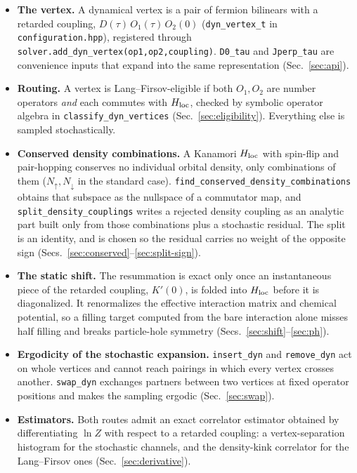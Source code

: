 \documentclass[a4paper,12pt]{article}
\renewcommand{\t}{\ensuremath{\tau}}
\newcommand{\Hloc}{\ensuremath{H_{\rm loc}}}
\begin{document}
\begin{itemize}
  \item \textbf{The vertex.} A dynamical vertex is a pair of fermion bilinears with a
    retarded coupling, $D(\t)\,O_1(\t)\,O_2(0)$ (\texttt{dyn\_vertex\_t} in
    \texttt{configuration.hpp}), registered through
    \texttt{solver.add\_dyn\_vertex(op1,op2,coupling)}. \texttt{D0\_tau} and
    \texttt{Jperp\_tau} are convenience inputs that expand into the same representation
    (Sec.~\ref{sec:api}).
  \item \textbf{Routing.} A vertex is Lang--Firsov-eligible if both $O_1,O_2$ are number
    operators \emph{and} each commutes with $\Hloc$, checked by symbolic operator algebra
    in \texttt{classify\_dyn\_vertices} (Sec.~\ref{sec:eligibility}). Everything else is
    sampled stochastically.
  \item \textbf{Conserved density combinations.} A Kanamori $\Hloc$ with spin-flip and
    pair-hopping conserves no individual orbital density, only combinations of them
    ($N_\uparrow,N_\downarrow$ in the standard case).
    \texttt{find\_conserved\_density\_combinations} obtains that subspace as the nullspace
    of a commutator map, and \texttt{split\_density\_couplings} writes a rejected density
    coupling as an analytic part built only from those combinations plus a stochastic
    residual. The split is an identity, and is chosen so the residual carries no weight of
    the opposite sign (Secs.~\ref{sec:conserved}--\ref{sec:split-sign}).
  \item \textbf{The static shift.} The resummation is exact only once an instantaneous
    piece of the retarded coupling, $K'(0)$, is folded into $\Hloc$ before it is
    diagonalized. It renormalizes the effective interaction matrix and chemical potential,
    so a filling target computed from the bare interaction alone misses half filling and
    breaks particle-hole symmetry (Secs.~\ref{sec:shift}--\ref{sec:ph}).
  \item \textbf{Ergodicity of the stochastic expansion.} \texttt{insert\_dyn} and
    \texttt{remove\_dyn} act on whole vertices and cannot reach pairings in which every
    vertex crosses another. \texttt{swap\_dyn} exchanges partners between two vertices at
    fixed operator positions and makes the sampling ergodic (Sec.~\ref{sec:swap}).
  \item \textbf{Estimators.} Both routes admit an exact correlator estimator obtained by
    differentiating $\ln Z$ with respect to a retarded coupling: a vertex-separation
    histogram for the stochastic channels, and the density-kink correlator for the
    Lang--Firsov ones (Sec.~\ref{sec:derivative}).
\end{itemize}
\end{document}
